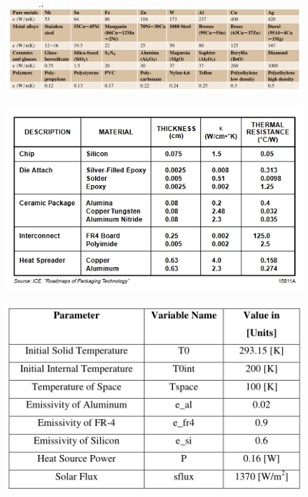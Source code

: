 \documentclass[final]{cubedoc}
\begin{document}
\begin{figure}[h!]
    \centering
    \includegraphics[width=\linewidth]{docs/table_properties_springer2.png}
    \caption{\cite[p.431]{kasap2017springer}}
    \label{fig:my_label}
\end{figure}

\begin{figure}[h!]
    \centering
    \includegraphics{docs/chip_properties.png}
    \caption{\cite[p.6-12]{chip}}
    \label{fig:my_label}
\end{figure}

\begin{figure}[h!]
    \centering
    \includegraphics[keepaspectratio, width=\textwidth]{docs/emissivity_silicon_fr4.png}
    \caption{\cite[p.41]{peake2014cubesat}}
    \label{fig:my_label}
\end{figure}
\end{document}
